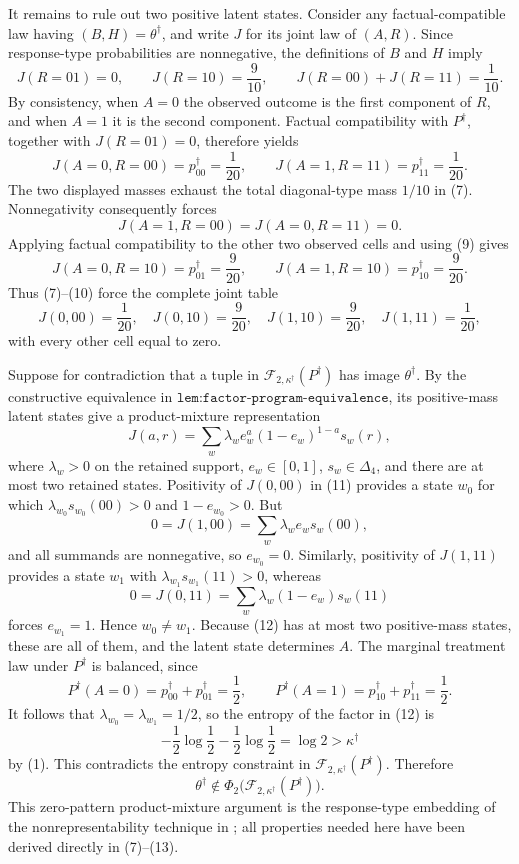 It remains to rule out two positive latent states.  Consider any factual-compatible law having \((B,H)=\theta^\dagger\), and write \(J\) for its joint law of \((A,R)\).  Since response-type probabilities are nonnegative, the definitions of \(B\) and \(H\) imply
\[
J(R=01)=0,
\qquad
J(R=10)=\frac9{10},
\qquad
J(R=00)+J(R=11)=\frac1{10}.
\tag{7}
\]
By consistency, when \(A=0\) the observed outcome is the first component of \(R\), and when \(A=1\) it is the second component.  Factual compatibility with \(P^\dagger\), together with \(J(R=01)=0\), therefore yields
\[
J(A=0,R=00)=p^\dagger_{00}=\frac1{20},
\qquad
J(A=1,R=11)=p^\dagger_{11}=\frac1{20}.
\tag{8}
\]
The two displayed masses exhaust the total diagonal-type mass \(1/10\) in (7).  Nonnegativity consequently forces
\[
J(A=1,R=00)=J(A=0,R=11)=0.
\tag{9}
\]
Applying factual compatibility to the other two observed cells and using (9) gives
\[
J(A=0,R=10)=p^\dagger_{01}=\frac9{20},
\qquad
J(A=1,R=10)=p^\dagger_{10}=\frac9{20}.
\tag{10}
\]
Thus (7)--(10) force the complete joint table
\[
J(0,00)=\frac1{20},\quad
J(0,10)=\frac9{20},\quad
J(1,10)=\frac9{20},\quad
J(1,11)=\frac1{20},
\tag{11}
\]
with every other cell equal to zero.

Suppose for contradiction that a tuple in \(\mathcal F_{2,\kappa^\dagger}(P^\dagger)\) has image \(\theta^\dagger\).  By the constructive equivalence in \(\texttt{lem:factor-program-equivalence}\), its positive-mass latent states give a product-mixture representation
\[
J(a,r)=\sum_w\lambda_w e_w^a(1-e_w)^{1-a}s_w(r),
\tag{12}
\]
where \(\lambda_w>0\) on the retained support, \(e_w\in[0,1]\), \(s_w\in\Delta_4\), and there are at most two retained states.  Positivity of \(J(0,00)\) in (11) provides a state \(w_0\) for which \(\lambda_{w_0}s_{w_0}(00)>0\) and \(1-e_{w_0}>0\).  But
\[
0=J(1,00)=\sum_w\lambda_w e_ws_w(00),
\]
and all summands are nonnegative, so \(e_{w_0}=0\).  Similarly, positivity of \(J(1,11)\) provides a state \(w_1\) with \(\lambda_{w_1}s_{w_1}(11)>0\), whereas
\[
0=J(0,11)=\sum_w\lambda_w(1-e_w)s_w(11)
\]
forces \(e_{w_1}=1\).  Hence \(w_0\ne w_1\).  Because (12) has at most two positive-mass states, these are all of them, and the latent state determines \(A\).  The marginal treatment law under \(P^\dagger\) is balanced, since
\[
P^\dagger(A=0)=p^\dagger_{00}+p^\dagger_{01}=\frac12,
\qquad
P^\dagger(A=1)=p^\dagger_{10}+p^\dagger_{11}=\frac12.
\]
It follows that \(\lambda_{w_0}=\lambda_{w_1}=1/2\), so the entropy of the factor in (12) is
\[
-\frac12\log\frac12-\frac12\log\frac12=\log2>\kappa^\dagger
\tag{13}
\]
by (1).  This contradicts the entropy constraint in \(\mathcal F_{2,\kappa^\dagger}(P^\dagger)\).  Therefore
\[
\theta^\dagger\notin\Phi_2\bigl(\mathcal F_{2,\kappa^\dagger}(P^\dagger)\bigr).
\tag{14}
\]
This zero-pattern product-mixture argument is the response-type embedding of the nonrepresentability technique in \citet[Section V, Example 2 and Appendix A]{KumarLiElGamal2014}; all properties needed here have been derived directly in (7)--(13).


